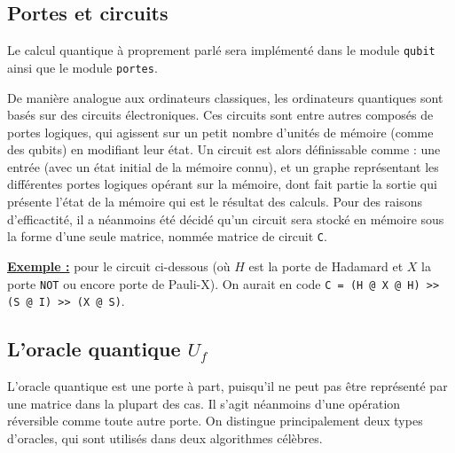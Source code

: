 \documentclass[french]{article}
\newcommand{\p}{\texttt} %
\newcommand{\exemple}{\textbf{\underline{Exemple :} }}
\begin{document}
\subsection{Portes et circuits}

Le calcul quantique à proprement parlé sera implémenté dans le module \p{qubit} ainsi que le module \p{portes}.


De manière analogue aux ordinateurs classiques, les ordinateurs quantiques sont basés sur des circuits électroniques. Ces circuits sont entre autres composés de portes logiques, qui agissent sur un petit nombre d'unités de mémoire (comme des qubits) en modifiant leur état. Un circuit est alors définissable comme : une entrée (avec un état initial de la mémoire connu), et un graphe représentant les différentes portes logiques opérant sur la mémoire, dont fait partie la sortie qui présente l'état de la mémoire qui est le résultat des calculs. Pour des raisons d'efficactité, il a néanmoins été décidé qu'un circuit sera stocké en mémoire sous la forme d'une seule matrice, nommée matrice de circuit \p{C}.


\noindent \exemple pour le circuit ci-dessous (où $H$ est la porte de Hadamard et $X$ la porte \p{NOT} ou encore porte de Pauli-X). On aurait en code \texttt{C = (H @  X @ H) >> (S @ I) >> (X @ S)}.



\subsection{L'oracle quantique $U_f$}


L'oracle quantique est une porte à part, puisqu'il ne peut pas être représenté par une matrice dans la plupart des cas. Il s'agit néanmoins d'une opération réversible comme toute autre porte. On distingue principalement deux types d'oracles, qui sont utilisés dans deux algorithmes célèbres.
\end{document}
